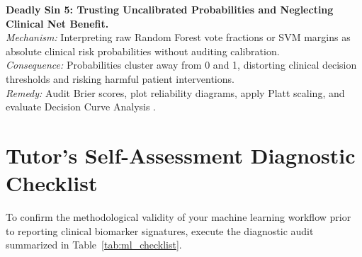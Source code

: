 \documentclass[11pt,oneside]{book}
\begin{document}
\begin{pitfallbox}[top=3pt, bottom=3pt, before skip=3pt, after skip=3pt]
\textbf{Deadly Sin 5: Trusting Uncalibrated Probabilities and Neglecting Clinical Net Benefit.}\\
\textit{Mechanism:} Interpreting raw Random Forest vote fractions or SVM margins as absolute clinical risk probabilities without auditing calibration.\\
\textit{Consequence:} Probabilities cluster away from 0 and 1, distorting clinical decision thresholds and risking harmful patient interventions.\\
\textit{Remedy:} Audit Brier scores, plot reliability diagrams, apply Platt scaling, and evaluate Decision Curve Analysis \cite{brier1950verification, vickers2006decision}.
\end{pitfallbox}

\clearpage

\section{Tutor's Self-Assessment Diagnostic Checklist}

To confirm the methodological validity of your machine learning workflow prior to reporting clinical biomarker signatures, execute the diagnostic audit summarized in Table~\ref{tab:ml_checklist}.
\end{document}
